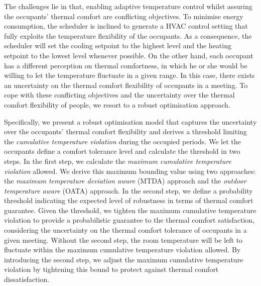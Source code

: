 The challenges lie in that, enabling adaptive temperature control whilst assuring the occupants' thermal comfort are conflicting objectives. To minimise energy consumption, the scheduler is inclined to generate a HVAC control setting that fully exploits the temperature flexibility of the occupants. 
As a consequence, the scheduler will set the cooling setpoint to the highest level and the heating setpoint to the lowest level whenever possible.
On the other hand, each occupant has a different perception on thermal comfortness, in which he or she would be willing to let the temperature fluctuate in a given range. In this case, there exists an uncertainty on the thermal comfort flexibility of occupants in a meeting.
To cope with these conflicting objectives and the uncertainty over the thermal comfort flexibility of people, we resort to a robust optimisation approach. 

Specifically, we present a robust optimisation model that captures the uncertainty over the occupants' thermal comfort flexibility and derives a threshold limiting the \textsl{cumulative temperature violation} during the occupied periods. We let the occupants define a comfort tolerance level and calculate the threshold in two steps. 
In the first step, we calculate the \textsl{maximum cumulative temperature violation} allowed. 
We derive this maximum bounding value using two approaches: the \emph{\textsl{maximum temperature deviation aware}} (MTDA) approach and the \emph{\textsl{outdoor temperature aware}} (OATA) approach.
In the second step, we define a probability threshold indicating the expected level of robustness in terms of thermal comfort guarantee. 
Given the threshold, we tighten the maximum cumulative temperature violation to provide a probabilistic guarantee to the thermal comfort satisfaction, considering the uncertainty on the thermal comfort tolerance of occupants in a given meeting. 
Without the second step, the room temperature will be left to fluctuate within the maximum cumulative temperature violation allowed. %
By introducing the second step, we adjust the maximum cumulative temperature violation by tightening this bound to protect against thermal comfort dissatisfaction. 


